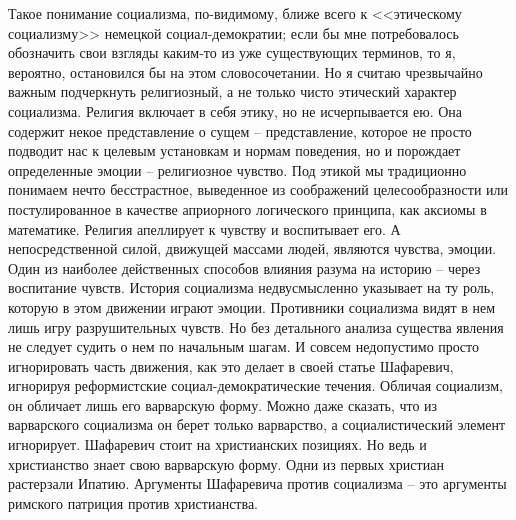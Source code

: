 \documentclass{book}
\begin{document}
Такое понимание социализма, по-видимому, ближе всего к <<этическому социализму>> немецкой социал-демократии; если бы мне потребовалось обозначить свои взгляды каким-то из уже существующих терминов, то я, вероятно, остановился бы на этом словосочетании. Но я считаю чрезвычайно важным под­черкнуть религиозный, а не только чисто этический характер социализма. Религия включает в себя этику, но не исчерпывает­ся ею. Она содержит некое представление о сущем -- представ­ление, которое не просто подводит нас к целевым установкам и нормам поведения, но и порождает определенные эмоции -- религиозное чувство. Под этикой мы традиционно понимаем нечто бесстрастное, выведенное из соображений целесообраз­ности или постулированное в качестве априорного логического принципа, как аксиомы в математике. Религия апеллирует к чувству и воспитывает его. А непосредственной силой, движу­щей массами людей, являются чувства, эмоции. Один из наибо­лее действенных способов влияния разума на историю -- через воспитание чувств. История 
социализма недвусмысленно указы­вает на ту роль, которую в этом движении играют эмоции. Про­тивники социализма видят в нем лишь игру разрушительных чувств. Но без детального анализа существа явления не следует судить о нем по начальным шагам. И совсем недопустимо про­сто игнорировать часть движения, как это делает в своей статье Шафаревич, игнорируя реформистские социал-демократические течения. Обличая социализм, он обличает лишь его варварскую форму. Можно даже сказать, что из варварского социализма он берет только варварство, а социалистический элемент игно­рирует. Шафаревич стоит на христианских позициях. Но ведь и христианство знает свою варварскую форму. Одни из первых христиан растерзали Ипатию. Аргументы Шафаревича против социализма -- это аргументы римского патриция против хри­стианства.
\end{document}
